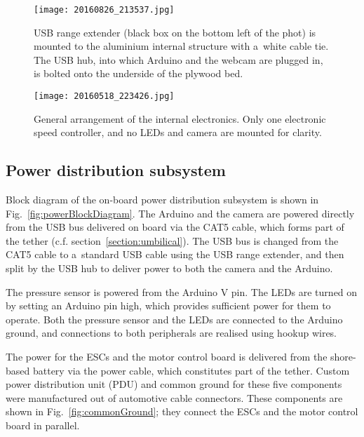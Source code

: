 \begin{figure}[htb]
\begin{minipage}[b]{1\linewidth}
  \centering
	\texttt{[image: 20160826\_213537.jpg]}
\end{minipage}
\caption{USB range extender (black box on the bottom left of the phot) is mounted to the aluminium internal structure with a~white cable tie. The USB hub, into which Arduino and the webcam are plugged in, is bolted onto the underside of the plywood bed.}
\label{fig:usbExtenderAndHub}
\end{figure}

\begin{figure}[htb]
\begin{minipage}[b]{1\linewidth}
  \centering
	\texttt{[image: 20160518\_223426.jpg]}
\end{minipage}
\caption{General arrangement of the internal electronics. Only one electronic speed controller, and no LEDs and camera are mounted for clarity.}
\label{fig:simpleInternalOverview}
\end{figure}

\clearpage %

\subsection{Power distribution subsystem}\label{ssection:powerDsitrbution}
Block diagram of the on-board power distribution subsystem is shown in Fig.~\ref{fig:powerBlockDiagram}. The Arduino and the camera are powered directly from the USB bus delivered on board via the CAT5 cable, which forms part of the tether (c.f. section~\ref{section:umbilical}). The USB bus is changed from the CAT5 cable to a~standard USB cable using the USB range extender, and then split by the USB hub to deliver power to both the camera and the Arduino.

The pressure sensor is powered from the Arduino \unit[5]{V} pin. The LEDs are turned on by setting an Arduino pin high, which provides sufficient power for them to operate. Both the pressure sensor and the LEDs are connected to the Arduino ground, and connections to both peripherals are realised using hookup wires.

The power for the ESCs and the motor control board is delivered from the shore-based battery via the power cable, which constitutes part of the tether. Custom power distribution unit (PDU) and common ground for these five components were manufactured out of automotive cable connectors. These components are shown in Fig.~\ref{fig:commonGround}; they connect the ESCs and the motor control board in parallel.

